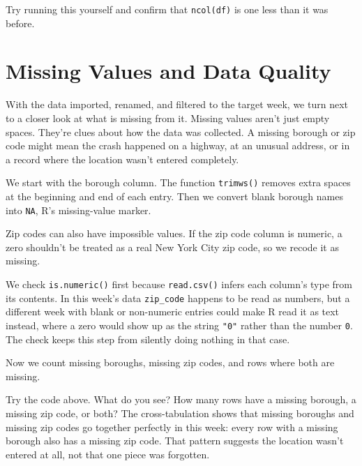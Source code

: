 
Try running this yourself and confirm that \lstinline{ncol(df)} is one
less than it was before.

\section{Missing Values and Data Quality}

With the data imported, renamed, and filtered to the target week, we
turn next to a closer look at what is missing from it. Missing
values aren't just empty spaces. They're clues
about how the data was collected. A missing borough or zip code might
mean the crash happened on a highway, at an unusual address, or in a
record where the location wasn't entered completely.

We start with the  borough column. The function
\lstinline{trimws()} removes extra spaces at the beginning and end of
each entry. Then we convert blank borough names into \lstinline{NA},
R's missing-value marker.


Zip codes can also have impossible values. If the zip
code column is numeric, a zero shouldn't be treated as a real New York
City zip code, so we recode it as missing.


We check \lstinline{is.numeric()} first because \lstinline{read.csv()}
infers each column's type from its contents. In this week's data
\lstinline{zip_code} happens to be read as numbers, but a different
week with blank or non-numeric entries could make R read it as text
instead, where a zero would show up as the string \lstinline{"0"}
rather than the number \lstinline{0}. The check keeps this step from
silently doing nothing in that case.

Now we count missing boroughs, missing zip codes, and rows where both
are missing.


Try the code above. What do you see? How many rows have a missing 
borough, a missing zip code, or both?
The cross-tabulation shows that missing boroughs and missing zip codes
go together perfectly in this week: every row with a missing borough
also has a missing zip code. That pattern suggests the location wasn't
entered at all, not that one piece was forgotten.


